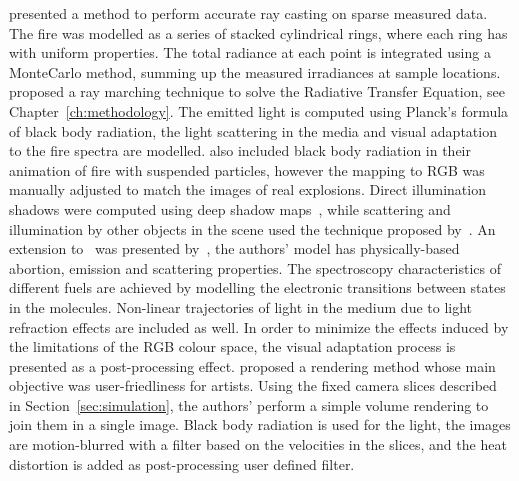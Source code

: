\cite{Rushmeier:1995} presented a method to perform accurate ray casting on sparse measured data.
The fire was modelled as a series of stacked cylindrical rings, where each ring has with uniform properties.
The total radiance at each point is integrated using a MonteCarlo method, summing up the measured irradiances at sample locations. 
\cite{Nguyen:2002} proposed a ray marching technique to solve the Radiative Transfer Equation, see Chapter~\ref{ch:methodology}.
The emitted light is computed using Planck's formula of black body radiation, the light scattering in the media and visual adaptation to the fire spectra are modelled.
\cite{Feldman:2003} also included black body radiation in their animation of fire with suspended particles, however the mapping to RGB was manually adjusted to match the images of real explosions.
Direct illumination shadows were computed using deep shadow maps~\cite{Lokovic:2000}, while scattering and illumination by other objects in the scene used the technique proposed by~\cite{Jensen:2002}.
An extension to~\cite{Nguyen:2002} was presented by~\cite{Pegoraro:2006}, the authors' model has physically-based abortion, emission and scattering properties.
The spectroscopy characteristics of different fuels are achieved by modelling the electronic transitions between states in the molecules.
Non-linear trajectories of light in the medium due to light refraction effects are included as well.
In order to minimize the effects induced by the limitations of the RGB colour space, the visual adaptation process is presented as a post-processing effect.
\cite{Horvath:2009} proposed a rendering method whose main objective was user-friedliness for artists.
Using the fixed camera slices described in Section~\ref{sec:simulation}, the authors' perform a simple volume rendering to join them in a single image.
Black body radiation is used for the light, the images are motion-blurred with a filter based on the velocities in the slices, and the heat distortion is added as post-processing user defined filter. 
